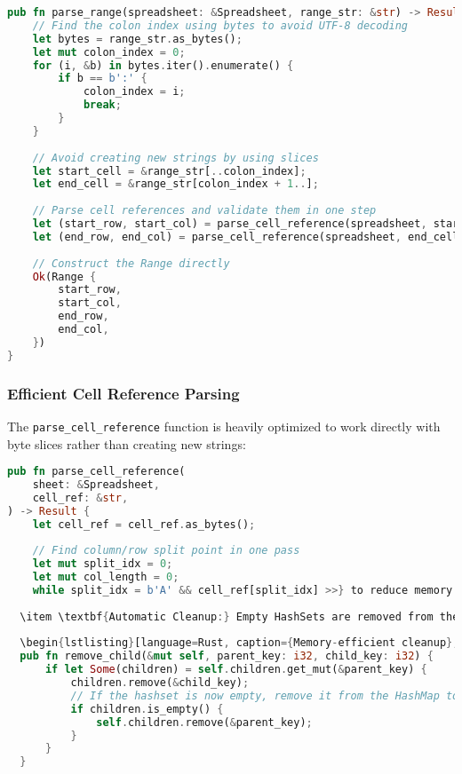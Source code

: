 \documentclass[11pt,a4paper]{article}
\begin{document}
\begin{lstlisting}[language=Rust, caption={Optimized range parsing}, label=lst:range-parsing]
pub fn parse_range(spreadsheet: &Spreadsheet, range_str: &str) -> Result {
    // Find the colon index using bytes to avoid UTF-8 decoding
    let bytes = range_str.as_bytes();
    let mut colon_index = 0;
    for (i, &b) in bytes.iter().enumerate() {
        if b == b':' {
            colon_index = i;
            break;
        }
    }
    
    // Avoid creating new strings by using slices
    let start_cell = &range_str[..colon_index];
    let end_cell = &range_str[colon_index + 1..];
    
    // Parse cell references and validate them in one step
    let (start_row, start_col) = parse_cell_reference(spreadsheet, start_cell)?;
    let (end_row, end_col) = parse_cell_reference(spreadsheet, end_cell)?;
    
    // Construct the Range directly
    Ok(Range {
        start_row,
        start_col,
        end_row,
        end_col,
    })
}
\end{lstlisting}

\subsubsection{Efficient Cell Reference Parsing}

The \lstinline{parse_cell_reference} function is heavily optimized to work directly with byte slices rather than creating new strings:

\begin{lstlisting}[language=Rust, caption={Optimized cell reference parsing}, label=lst:cell-ref-parsing]
pub fn parse_cell_reference(
    sheet: &Spreadsheet,
    cell_ref: &str,
) -> Result {
    let cell_ref = cell_ref.as_bytes();
    
    // Find column/row split point in one pass
    let mut split_idx = 0;
    let mut col_length = 0;
    while split_idx = b'A' && cell_ref[split_idx] >>} to reduce memory overhead for the many small HashSets that typically exist.
  
  \item \textbf{Automatic Cleanup:} Empty HashSets are removed from the \lstinline{children} map to save memory:
  
  \begin{lstlisting}[language=Rust, caption={Memory-efficient cleanup}, label=lst:memory-cleanup]
  pub fn remove_child(&mut self, parent_key: i32, child_key: i32) {
      if let Some(children) = self.children.get_mut(&parent_key) {
          children.remove(&child_key);
          // If the hashset is now empty, remove it from the HashMap to save memory
          if children.is_empty() {
              self.children.remove(&parent_key);
          }
      }
  }
  \end{lstlisting}
  
\end{document}
